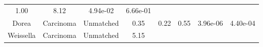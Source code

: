 \documentclass[12pt,]{article}
\begin{document}
\begin{longtable}[]{@{}cccccccc@{}}
\begin{minipage}[t]{0.14\columnwidth}
1.00\strut
\end{minipage} & \begin{minipage}[t]{0.14\columnwidth}\centering\strut
8.12\strut
\end{minipage} & \begin{minipage}[t]{0.06\columnwidth}\centering\strut
4.94e-02\strut
\end{minipage} & \begin{minipage}[t]{0.06\columnwidth}\centering\strut
6.66e-01\strut
\end{minipage}\tabularnewline
\begin{minipage}[t]{0.18\columnwidth}\centering\strut
Dorea\strut
\end{minipage} & \begin{minipage}[t]{0.07\columnwidth}\centering\strut
Carcinoma\strut
\end{minipage} & \begin{minipage}[t]{0.09\columnwidth}\centering\strut
Unmatched\strut
\end{minipage} & \begin{minipage}[t]{0.03\columnwidth}\centering\strut
0.35\strut
\end{minipage} & \begin{minipage}[t]{0.14\columnwidth}\centering\strut
0.22\strut
\end{minipage} & \begin{minipage}[t]{0.14\columnwidth}\centering\strut
0.55\strut
\end{minipage} & \begin{minipage}[t]{0.06\columnwidth}\centering\strut
3.96e-06\strut
\end{minipage} & \begin{minipage}[t]{0.06\columnwidth}\centering\strut
4.40e-04\strut
\end{minipage}\tabularnewline
\begin{minipage}[t]{0.18\columnwidth}\centering\strut
Weissella\strut
\end{minipage} & \begin{minipage}[t]{0.07\columnwidth}\centering\strut
Carcinoma\strut
\end{minipage} & \begin{minipage}[t]{0.09\columnwidth}\centering\strut
Unmatched\strut
\end{minipage} & \begin{minipage}[t]{0.03\columnwidth}\centering\strut
5.15\strut
\end{minipage} & \begin{minipage}[t]{0.14\columnwidth}\centering\strut

\end{minipage}
\end{longtable}
\end{document}
